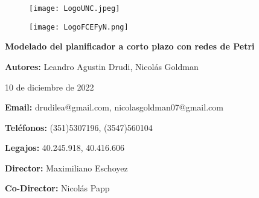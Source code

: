 \begin{titlepage}
    \begin{center}
        \vspace*{1cm}

        \begin{figure}
            \centering
            \begin{minipage}[t]{0.45\textwidth}\centering%
                \texttt{[image: LogoUNC.jpeg]}
            \end{minipage}\hfill
            \begin{minipage}[t]{0.45\textwidth}\centering%
                \texttt{[image: LogoFCEFyN.png]}
            \end{minipage}
        \end{figure}

        \Huge
        \textbf{Modelado del planificador a corto plazo con redes de Petri}

        \vspace{1.5cm}

        \Large
        \textbf{Autores:} Leandro Agustin Drudi, Nicolás Goldman
        \vspace{.5cm}

        \large
        10 de diciembre de 2022
        \vspace{1cm}

        \normalsize
        \textbf{Email:} drudilea@gmail.com, nicolasgoldman07@gmail.com
        \vspace{.5cm}

        \textbf{Teléfonos:} (351)5307196, (3547)560104
        \vspace{.5cm}

        \textbf{Legajos:} 40.245.918, 40.416.606
        \vspace{1.5cm}

        \textbf{Director:} Maximiliano Eschoyez
        \vspace{.5cm}

        \textbf{Co-Director:} Nicolás Papp
        \vspace{1cm}

        \vspace{0.5cm}

        \vfill

    \end{center}
\end{titlepage}